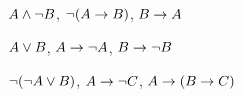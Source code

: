 \begin{earg}
\item $A \wedge \neg B$, $\neg(A \rightarrow B)$, $B \rightarrow A$\vspace{.5ex} %


\item $A \vee B$, $A \rightarrow \neg A$, $B \rightarrow \neg B$ \vspace{.5ex}%


\item $\neg(\neg A \vee B) $, $A \rightarrow \neg C$, $A \rightarrow (B \rightarrow C)$\vspace{.5ex} %


\end{earg}
